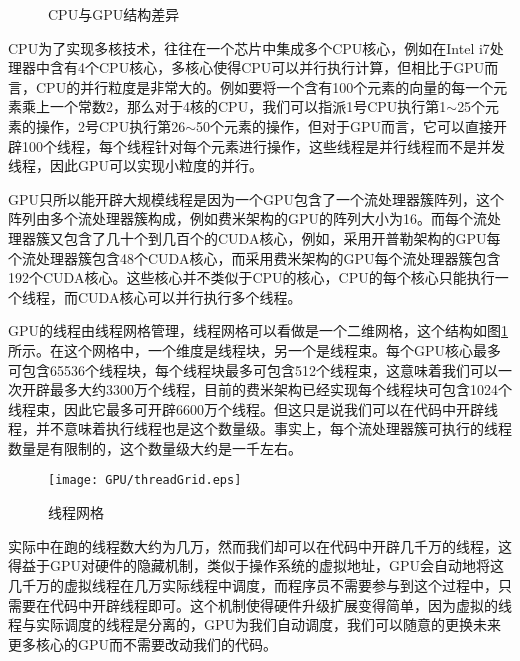 \begin{figure}[htbp]
\centering
\subfigure{\label{img:CPU}}\addtocounter{subfigure}{-2}
\subfigure{\label{img:GPU}}\addtocounter{subfigure}{-2}
\caption{CPU与GPU结构差异}
\vspace{-1em}
\end{figure}

CPU为了实现多核技术，往往在一个芯片中集成多个CPU核心，例如在Intel i7处理器中含有4个CPU核心，多核心使得CPU可以并行执行计算，但相比于GPU而言，CPU的并行粒度是非常大的。例如要将一个含有100个元素的向量的每一个元素乘上一个常数2，那么对于4核的CPU，我们可以指派1号CPU执行第1$\sim$25个元素的操作，2号CPU执行第26$\sim$50个元素的操作，但对于GPU而言，它可以直接开辟100个线程，每个线程针对每个元素进行操作，这些线程是并行线程而不是并发线程，因此GPU可以实现小粒度的并行。

GPU只所以能开辟大规模线程是因为一个GPU包含了一个流处理器簇阵列，这个阵列由多个流处理器簇构成，例如费米架构的GPU的阵列大小为16。而每个流处理器簇又包含了几十个到几百个的CUDA核心，例如，采用开普勒架构的GPU每个流处理器簇包含48个CUDA核心，而采用费米架构的GPU每个流处理器簇包含192个CUDA核心。这些核心并不类似于CPU的核心，CPU的每个核心只能执行一个线程，而CUDA核心可以并行执行多个线程。

GPU的线程由线程网格管理，线程网格可以看做是一个二维网格，这个结构如图\ref{img:thread grid}所示。在这个网格中，一个维度是线程块，另一个是线程束。每个GPU核心最多可包含65536个线程块，每个线程块最多可包含512个线程束，这意味着我们可以一次开辟最多大约3300万个线程，目前的费米架构已经实现每个线程块可包含1024个线程束，因此它最多可开辟6600万个线程。但这只是说我们可以在代码中开辟线程，并不意味着执行线程也是这个数量级。事实上，每个流处理器簇可执行的线程数量是有限制的，这个数量级大约是一千左右。

\begin{figure}[!htbp]
\centering
\texttt{[image: GPU/threadGrid.eps]}
\caption{线程网格}
\label{img:thread grid}
\end{figure}

实际中在跑的线程数大约为几万，然而我们却可以在代码中开辟几千万的线程，这得益于GPU对硬件的隐藏机制，类似于操作系统的虚拟地址，GPU会自动地将这几千万的虚拟线程在几万实际线程中调度，而程序员不需要参与到这个过程中，只需要在代码中开辟线程即可。这个机制使得硬件升级扩展变得简单，因为虚拟的线程与实际调度的线程是分离的，GPU为我们自动调度，我们可以随意的更换未来更多核心的GPU而不需要改动我们的代码。

